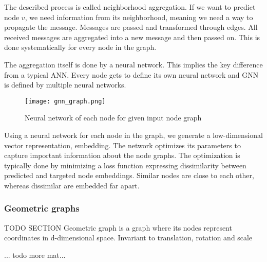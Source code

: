 The described process is called neighborhood aggregation. If we want to predict node $v$, we need information from its neighborhood, meaning we need a way to propagate the message. Messages are passed and transformed through edges. All received messages are aggregated into a new message and then passed on. This is done systematically for every node in the graph.

The aggregation itself is done by a neural network. This implies the key difference from a typical ANN. Every node gets to define its own neural network and GNN is defined by multiple neural networks.

\begin{figure}[h]
  \centering
  \texttt{[image: gnn\_graph.png]}
  \caption{Neural network of each node for given input node graph \cite{stanford}}
  \label{fig:gnn_graph}
\end{figure}

Using a neural network for each node in the graph, we generate a low-dimensional vector representation, embedding. The network optimizes its parameters to capture important information about the node graphs. The optimization is typically done by minimizing a loss function expressing dissimilarity between predicted and targeted node embeddings. Similar nodes are close to each other, whereas dissimilar are embedded far apart. 

\subsubsection{Geometric graphs}
TODO SECTION
Geometric graph is a graph where its nodes represent coordinates in d-dimensional space. Invariant to translation, rotation and scale

... todo more mat... 
